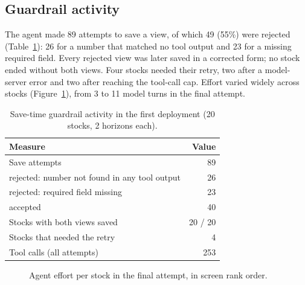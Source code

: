 \documentclass[preprint,11pt]{elsarticle}
\begin{document}
\subsection{Guardrail activity}

The agent made 89 attempts to save a view, of which 49 (55\%) were rejected (Table~\ref{tab:guard}): 26 for a
number that matched no tool output and 23 for a missing required field. Every rejected view was later saved
in a corrected form; no stock ended without both views. Four stocks needed their retry, two after a
model-server error and two after reaching the tool-call cap. Effort varied widely across stocks
(Figure~\ref{fig:effort}), from 3 to 11 model turns in the final attempt.

\begin{table}[t]
\centering\small
\caption{Save-time guardrail activity in the first deployment (20 stocks, 2 horizons each).}
\label{tab:guard}
\begin{tabular}{@{}lr@{}}
\toprule
Measure & Value \\
\midrule
Save attempts & 89 \\
\quad rejected: number not found in any tool output & 26 \\
\quad rejected: required field missing & 23 \\
\quad accepted & 40 \\
Stocks with both views saved & 20 / 20 \\
Stocks that needed the retry & 4 \\
Tool calls (all attempts) & 253 \\
\bottomrule
\end{tabular}
\end{table}

\begin{figure}[t]
\centering
{}
\caption{Agent effort per stock in the final attempt, in screen rank order.}
\label{fig:effort}
\end{figure}
\end{document}
